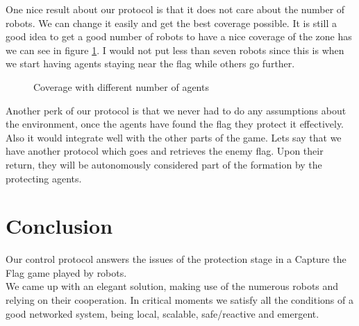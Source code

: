 \documentclass[journal]{IEEEtran}
\begin{document}
One nice result about our protocol is that it does not care about the number of robots. We can change it easily and get the best coverage possible. It is still a good idea to get a good number of robots to have a nice coverage of the zone has we can see in figure \ref{vrn_nba}. I would not put less than seven robots since this is when we start having agents staying near the flag while others go further.
\begin{figure}
	\centering
	\quad
	\quad
	\quad
	\quad
	\caption{Coverage with different number of agents}
	\label{vrn_nba}
\end{figure}

Another perk of our protocol is that we never had to do any assumptions about the environment, once the agents have found the flag they protect it effectively.\\

Also it would integrate well with the other parts of the game. Lets say that we have another protocol which goes and retrieves the enemy flag. Upon their return, they will be autonomously considered part of the formation by the protecting agents.

\section{Conclusion}

Our control protocol answers the issues of the protection stage in a Capture the Flag game played by robots.\\

We came up with an elegant solution, making use of the numerous robots and relying on their cooperation. In critical moments we satisfy all the conditions of a good networked system, being local, scalable, safe/reactive and emergent.\\
\end{document}
